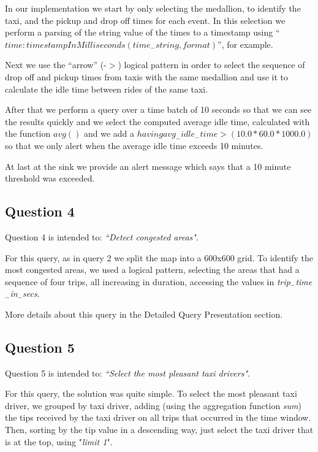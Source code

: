In our implementation we start by only selecting the medallion, to identify the taxi, and the pickup and drop off times for each event. In this selection we perform a parsing of the string value of the times to a timestamp using ``$time:timestampInMilliseconds(time_-string, format)$'', for example.

Next we use the ``arrow'' (-$>$) logical pattern in order to select the sequence of drop off and pickup times from taxis with the same medallion and use it to calculate the idle time between rides of the same taxi.

After that we perform a query over a time batch of 10 seconds so that we can see the results quickly and we select the computed average idle time, calculated with the function \textit{$avg()$} and we add a \textit{$having avg_-idle_-time > (10.0*60.0*1000.0)$} so that we only alert when the average idle time exceeds 10 minutes.

At last at the sink we provide an alert message which says that a 10 minute threshold was exceeded.

\subsection{Question 4}

Question 4 is intended to: \textit{``Detect congested areas"}.\par
For this query, as in query 2 we split the map into a 600x600 grid. To identify the most congested areas, we used a logical pattern, selecting the areas that had a sequence of four trips, all increasing in duration, accessing the values in \textit{trip$_-$time$_-$in$_-$secs}.\par
More details about this query in the Detailed Query Presentation section. 

\subsection{Question 5}

Question 5 is intended to: \textit{``Select the most pleasant taxi drivers"}.\par
For this query, the solution was quite simple. To select the most pleasant taxi driver, we grouped by taxi driver, adding (using the aggregation function \textit{sum}) the tips received by the taxi driver on all trips that occurred in the time window. Then, sorting by the tip value in a descending way, just select the taxi driver that is at the top, using "\textit{limit 1}". 













